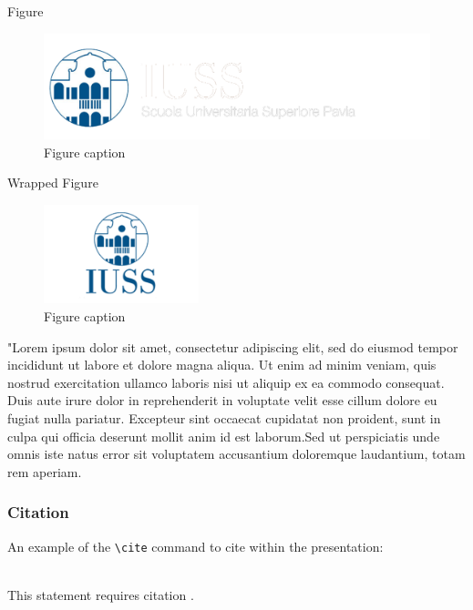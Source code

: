 \documentclass[aspectratio=169,xcolor=dvipsnames, t]{beamer}
\begin{document}
\begin{frame}{Figure}
    \begin{figure}
    \includegraphics[height=0.5\paperheight]{AICStyleData/logos/Logo-IUSS.png}
    \caption{Figure caption}
    \end{figure}
\end{frame}

\begin{frame}{Wrapped Figure}
    \begin{figure}
    \centering
    \includegraphics[width=0.4\textwidth]{AICStyleData/logos/LOGO_square_IUSS.png}
    \caption{Figure caption}
\end{figure}
"Lorem ipsum dolor sit amet, consectetur adipiscing elit, sed do eiusmod tempor incididunt ut labore et dolore magna aliqua. Ut enim ad minim veniam, quis nostrud exercitation ullamco laboris nisi ut aliquip ex ea commodo consequat. Duis aute irure dolor in reprehenderit in voluptate velit esse cillum dolore eu fugiat nulla pariatur. Excepteur sint occaecat cupidatat non proident, sunt in culpa qui officia deserunt mollit anim id est laborum.Sed ut perspiciatis unde omnis iste natus error sit voluptatem accusantium doloremque laudantium, totam rem aperiam.
\end{frame}

\begin{frame}[fragile] %
    \frametitle{Citation}
    An example of the \verb|\cite| command to cite within the presentation:\\~

    This statement requires citation \cite{rizzi_1976}.
\end{frame}
\end{document}

